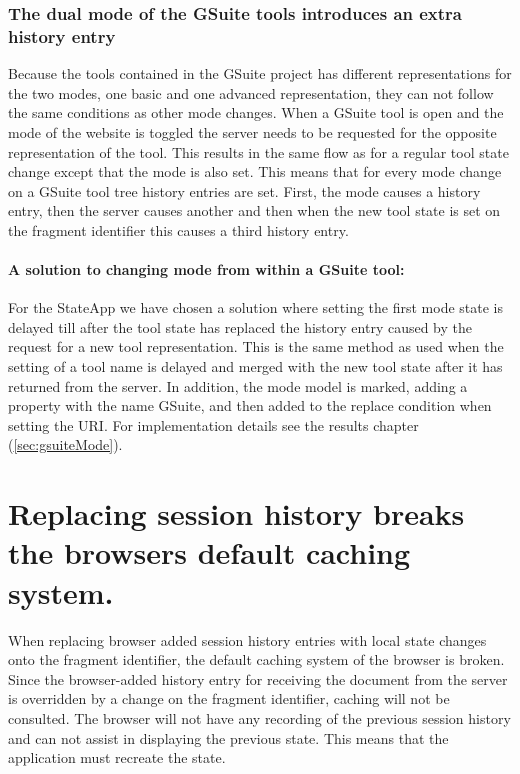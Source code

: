 \documentclass[english]{ifimaster}
\begin{document}
\subsubsection{The dual mode of the GSuite tools introduces an extra history entry}
Because the tools contained in the GSuite project has different representations for the two modes, one basic and one advanced representation, they can not follow the same conditions as other mode changes. When a GSuite tool is open and the mode of the website is toggled the server needs to be requested for the opposite representation of the tool. This results in the same flow as for a regular tool state change except that the mode is also set. This means that for every mode change on a GSuite tool tree history entries are set. First, the mode causes a history entry, then the server causes another and then when the new tool state is set on the fragment identifier this causes a third history entry. 

\paragraph{A solution to changing mode from within a GSuite tool:}
For the StateApp we have chosen a solution where setting the first mode state is delayed till after the tool state has replaced the history entry caused by the request for a new tool representation. This is the same method as used when the setting of a tool name is delayed and merged with the new tool state after it has returned from the server. In addition, the mode model is marked, adding a property with the name GSuite, and then added to the replace condition when setting the URI. For implementation details see the results chapter (\ref{sec:gsuiteMode}).

\section{Replacing session history breaks the browsers default caching system.}
When replacing browser added session history entries with local state changes onto the fragment identifier, the default caching system of the browser is broken. Since the browser-added history entry for receiving the document from the server is overridden by a change on the fragment identifier, caching will not be consulted. The browser will not have any recording of the previous session history and can not assist in displaying the previous state. This means that the application must recreate the state.   
\end{document}
